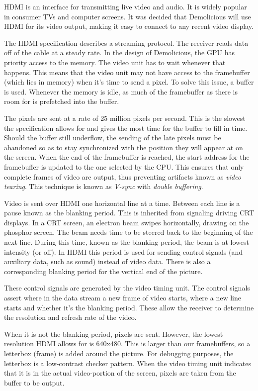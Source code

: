 \documentclass[../main/report.tex]{subfiles}
\begin{document}
HDMI is an interface for transmitting live video and audio.
It is widely popular in consumer TVs and computer screens.
It was decided that Demolicious will use HDMI for its video output, making it easy to connect to any recent video display.

The HDMI specification describes a streaming protocol.
The receiver reads data off of the cable at a steady rate.
In the design of Demolicious, the GPU has priority access to the memory.
The video unit has to wait whenever that happens.
This means that the video unit may not have access to the framebuffer (which lies in memory) when it's time to send a pixel.
To solve this issue, a buffer is used.
Whenever the memory is idle, as much of the framebuffer as there is room for is prefetched into the buffer.

The pixels are sent at a rate of 25 million pixels per second.
This is the slowest the specification allows for and gives the most time for the buffer to fill in time.
Should the buffer still underflow, the sending of the late pixels must be abandoned so as to stay synchronized with the position they will appear at on the screen.
When the end of the framebuffer is reached, the start address for the framebuffer is updated to the one selected by the CPU.
This ensures that only complete frames of video are output, thus preventing artifacts known as \emph{video tearing}.
This technique is known as \emph{V-sync} with \emph{double buffering}.

Video is sent over HDMI one horizontal line at a time.
Between each line is a pause known as the blanking period.
This is inherited from signaling driving CRT displays.
In a CRT screen, an electron beam swipes horizontally, drawing on the phosphor screen.
The beam needs time to be steered back to the beginning of the next line.
During this time, known as the blanking period, the beam is at lowest intensity (or off).
In HDMI this period is used for sending control signals (and auxiliary data, such as sound) instead of video data.
There is also a corresponding blanking period for the vertical end of the picture.

These control signals are generated by the video timing unit.
The control signals assert where in the data stream a new frame of video starts, where a new line starts and whether it's the blanking period.
These allow the receiver to determine the resolution and refresh rate of the video.

When it is not the blanking period, pixels are sent.
However, the lowest resolution HDMI allows for is 640x480.
This is larger than our framebuffers, so a letterbox (frame) is added around the picture.
For debugging purposes, the letterbox is a low-contrast checker pattern.
When the video timing unit indicates that it is in the actual video-portion of the screen, pixels are taken from the buffer to be output.
\end{document}
